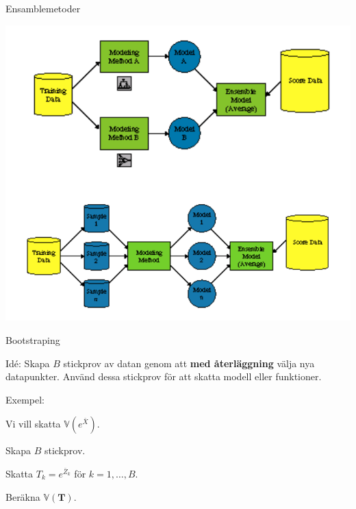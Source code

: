 \documentclass[10pt,english]{beamer}
\begin{document}
\begin{frame}{Ensamblemetoder}
    
    \includegraphics[width=.8\textwidth]{figs/ensample_cat.png}

\end{frame}

\begin{frame}{Bootstraping}
    
    \begin{greenbox}
        Idé: Skapa $B$ stickprov av datan genom att \textbf{med återläggning} välja nya datapunkter. Använd dessa stickprov för att skatta modell eller funktioner.
    \end{greenbox}

    Exempel:

    Vi vill skatta $\mathbb{V}(e^{\bar{X}})$.

    Skapa $B$ stickprov.

    Skatta $T_k = e^{\bar{Z}_k}$ för $k = 1, \ldots, B$.

    Beräkna $\mathbb{V}(\mathbf{T})$.


\end{frame}
\end{document}
